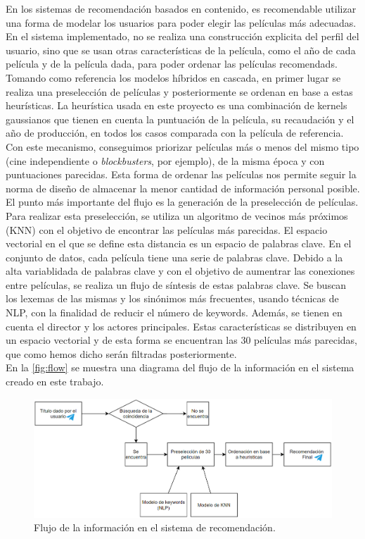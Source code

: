 En los sistemas de recomendación basados en contenido, es recomendable utilizar una forma de modelar los usuarios para poder elegir las películas más adecuadas. En el sistema implementado, no se realiza una construcción explicita del perfil del usuario, sino que se usan otras características de la película, como el año de cada película y de la película dada, para poder ordenar las películas recomendads. Tomando como referencia los modelos híbridos en cascada, en primer lugar se realiza una preselección de películas y posteriormente se ordenan en base a estas heurísticas. La heurística usada en este proyecto es una combinación de kernels gaussianos que tienen en cuenta la puntuación de la película, su recaudación y el año de producción, en todos los casos comparada con la película de referencia. Con este mecanismo, conseguimos priorizar películas más o menos del mismo tipo (cine independiente o \textit{blockbusters}, por ejemplo), de la misma época y con puntuaciones parecidas. Esta forma de ordenar las películas nos permite seguir la norma de diseño de almacenar la menor cantidad de información personal posible.\\

El punto más importante del flujo es la generación de la preselección de películas. Para realizar esta preselección, se utiliza un algoritmo de vecinos más próximos (KNN) con el objetivo de encontrar las películas más parecidas. El espacio vectorial en el que se define esta distancia es un espacio de palabras clave. En el conjunto de datos, cada película tiene una serie de palabras clave. Debido a la alta variablidada de palabras clave y con el objetivo de aumentrar las conexiones entre películas, se realiza un flujo de síntesis de estas palabras clave. Se buscan los lexemas de las mismas y los sinónimos más frecuentes, usando técnicas de NLP, con la finalidad de reducir el número de keywords. Además, se tienen en cuenta el director y los actores principales. Estas características se distribuyen en un espacio vectorial y de esta forma se encuentran las $30$ películas más parecidas, que como hemos dicho serán filtradas posteriormente.\\

En la \autoref{fig:flow} se muestra una diagrama del flujo de la información en el sistema creado en este trabajo.

\begin{figure}[h]
    \centering
    \captionsetup{width=12cm}
    \includegraphics[width=12cm]{contenido/imagenes/FLujodattos.png}
    \caption{Flujo de la información en el sistema de recomendación.}
    \label{fig:flow}
\end{figure}


